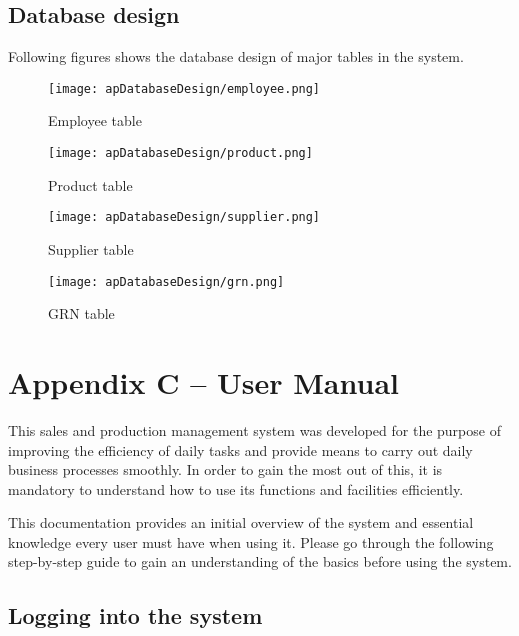 \documentclass[12pt]{report}
\begin{document}
\section{Database design}
Following figures shows the database design of major tables in the system.

\begin{figure}[H]
	\centering
	\texttt{[image: apDatabaseDesign/employee.png]}
	\caption{Employee table}
\end{figure}

\begin{figure}[H]
	\centering
	\texttt{[image: apDatabaseDesign/product.png]}
	\caption{Product table}
\end{figure}

\begin{figure}[H]
	\centering
	\texttt{[image: apDatabaseDesign/supplier.png]}
	\caption{Supplier table}
\end{figure}

\begin{figure}[H]
	\centering
	\texttt{[image: apDatabaseDesign/grn.png]}
	\caption{GRN table}
\end{figure}

\setcounter{chapter}{3}
\setcounter{section}{0}
\setcounter{figure}{0}
\chapter*{\Huge Appendix C – User Manual}
This sales and production management system was developed for the purpose of improving the efficiency of daily tasks and provide means to carry out daily business processes smoothly. In order to gain the most out of this, it is mandatory to understand how to use its functions and facilities efficiently.

This documentation provides an initial overview of the system and essential knowledge every user must have when using it. Please go through the following step-by-step guide to gain an understanding of the basics before using the system.

\section{Logging into the system}
\end{document}
